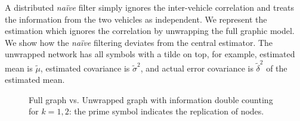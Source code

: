 
A distributed \textit{na\"ive} filter simply ignores the inter-vehicle correlation and treats the information from the two vehicles as independent. We represent the estimation which ignores the correlation by unwrapping the full graphic model. We show how the \textit{na\"ive} filtering deviates from the central estimator. The unwrapped network has all symbols with a tilde on top, for example, estimated mean is $\tilde\mu$, estimated covariance is $\tilde\sigma^2$, and actual error covariance is $\tilde\delta^2$ of the estimated mean.

\begin{figure}[htbp]
\begin{center}
\caption{Full graph vs. Unwrapped graph with information double counting for $k=1,2$: the prime symbol indicates the replication of nodes.}
\label{fig:LOOPYvsUN}
\end{center}
\end{figure}

